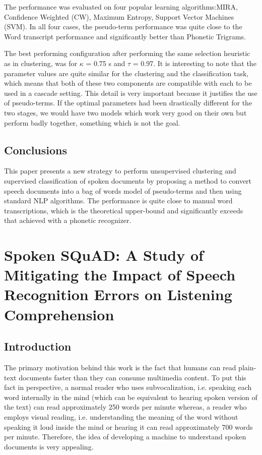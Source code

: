 \documentclass[a4paper]{article}
\begin{document}
The performance was evaluated on four popular learning algorithms:MIRA, Confidence Weighted (CW), Maximum Entropy, Support Vector Machines (SVM). In all four cases, the pseudo-term performance was quite close to the Word transcript performance and significantly better than Phonetic Trigrams.

The best performing configuration after performing the same selection heuristic as in clustering, was for $\kappa$ = 0.75 s and $\tau$ = 0.97. It is interesting to note that the parameter values are quite similar for the clustering and the classification task, which means that both of these two components are compatible with each to be used in a cascade setting. This detail is very important because it justifies the use of pseudo-terms. If the optimal parameters had been drastically different for the two stages, we would have two models which work very good on their own but perform badly together, something which is not the goal.


\subsection{Conclusions}
This paper presents a new strategy to perform unsupervised clustering and supervised classification of spoken documents by proposing a method to convert speech documents into a bag of words model of pseudo-terms and then using standard NLP algorithms. The performance is quite close to manual word transcriptions, which is the theoretical upper-bound and significantly exceeds that achieved with a phonetic recognizer.

\section{Spoken SQuAD: A Study of Mitigating the Impact of Speech Recognition Errors on Listening Comprehension}
\subsection{Introduction}
The primary motivation behind this work is the fact that humans can read plain-text documents faster than they can consume multimedia content. To put this fact in perspective, a normal reader who uses subvocalization, i.e. speaking each word internally in the mind (which can be equivalent to hearing spoken version of the text) can read approximately 250 words per minute whereas, a reader who employs visual reading, i.e. understanding the meaning of the word without speaking it loud inside the mind or hearing it can read approximately 700 words per minute. Therefore, the idea of developing a machine to understand spoken documents is very appealing.
\end{document}

